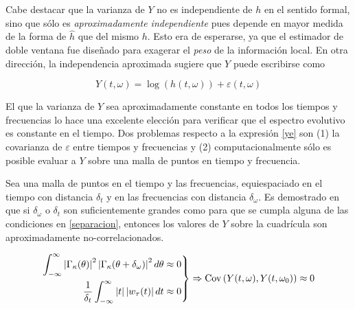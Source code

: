 Cabe destacar que la varianza de $Y$ no es independiente de $h$ en el sentido formal, sino que 
sólo es \textit{aproximadamente independiente} pues depende en mayor medida de la forma de 
$\widehat{h}$ que del mismo $h$.
%
Esto era de esperarse, ya que el estimador de doble ventana fue diseñado para exagerar el 
\textit{peso} de la información local. 
%
En otra dirección, la independencia aproximada sugiere que $Y$ puede escribirse como

\begin{equation}
Y(t,\omega) = \log\left(h(t,\omega) \right) + \varepsilon(t,\omega)
\label{ye}
\end{equation}

El que la varianza de $Y$ sea aproximadamente constante en todos los tiempos y frecuencias lo hace 
una excelente elección para verificar que el espectro evolutivo es constante en el tiempo.
%
Dos problemas respecto a la expresión \ref{ye} son (1) la covarianza de $\varepsilon$ entre
tiempos y frecuencias y (2) computacionalmente sólo es posible evaluar a $Y$ sobre una malla
de puntos en tiempo y frecuencia.

Sea una malla de puntos en el tiempo y las frecuencias, equiespaciado en el tiempo con distancia 
$\delta_t$ y en las frecuencias con distancia $\delta_\omega$.
Es demostrado en \cite{Priestley66} que si $\delta_\omega$ o $\delta_t$ son suficientemente grandes
como para que se cumpla alguna de las condiciones en \ref{separacion}, entonces los valores de $Y$
sobre la cuadrícula son aproximadamente no-correlacionados.

\begin{equation}
\left.
\begin{aligned}
\int_{-\infty}^{\infty} \left| \Gamma_\kappa(\theta) \right|^{2}\left| \Gamma_\kappa(\theta+\delta_\omega) \right|^{2} d\theta 
&\approx 0 \\
\frac{1}{\delta_t} \int_{-\infty}^{\infty} \left| t \right| \left| w_\tau (t) \right| dt &\approx 0
\end{aligned}
\right\rbrace
\Rightarrow
\mathrm{Cov}\left( Y(t,\omega),Y(t,\omega_0) \right) \approx 0
\label{separacion}
\end{equation}

